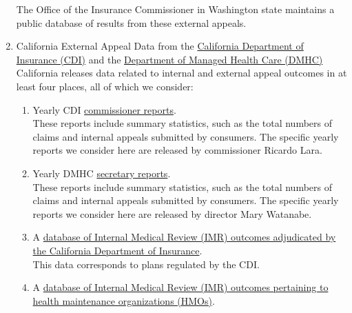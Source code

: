 \documentclass[12pt, a4paper]{report}
\begin{document}
\begin{enumerate}
	The Office of the Insurance Commissioner in Washington state maintains a public database of results from these external appeals.\\
	
	
	\item California External Appeal Data from the \href{https://interactive.web.insurance.ca.gov/apex_extprd/f?p=192:1:2660782937251:::::}{California Department of Insurance (CDI)} and the \href{https://dmhc.ca.gov/AbouttheDMHC/DMHCReports/AnnualReports.aspx}{Department of Managed Health Care (DMHC)}\\
	
	California releases data related to internal and external appeal outcomes in at least four places, all of which we consider:\\
	
	\begin{enumerate}
	\item Yearly CDI \href{https://www.insurance.ca.gov/0400-news/0200-studies-reports/0700-commissioner-report/}{commissioner reports}.\\
	
	These reports include summary statistics, such as the total numbers of claims and internal appeals submitted by consumers. The specific yearly reports we consider here are released by commissioner Ricardo Lara. \\
	
	\item Yearly DMHC \href{https://dmhc.ca.gov/AbouttheDMHC/DMHCReports/AnnualReports.aspx}{secretary reports}.\\
	
	These reports include summary statistics, such as the total numbers of claims and internal appeals submitted by consumers. The specific yearly reports we consider here are released by director Mary Watanabe.\\
	
	\item A \href{https://interactive.web.insurance.ca.gov/apex_extprd/f?p=192:1:5191948876739:::::}{database of Internal Medical Review (IMR) outcomes adjudicated by the California Department of Insurance}.\\
	
	This data corresponds to plans regulated by the CDI.\\
	
	\item A \href{https://data.chhs.ca.gov/dataset/independent-medical-review-imr-determinations-trend}{database of Internal Medical Review (IMR) outcomes pertaining to health maintenance organizations (HMOs)}.\\
	

\end{enumerate}
\end{enumerate}
\end{document}
